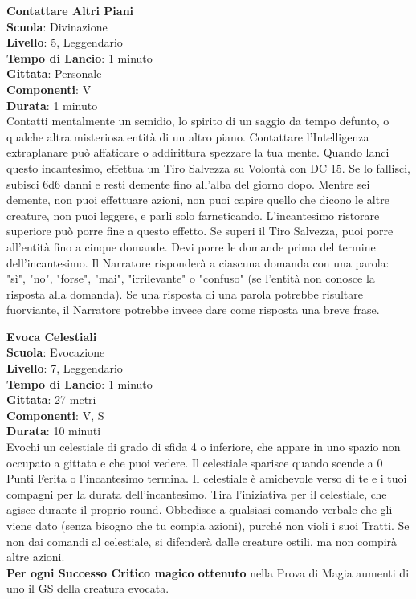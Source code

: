 \begin{multicols}{2}
\medskip\textbf{Contattare Altri Piani}\\
\textbf{Scuola}: Divinazione\\
\textbf{Livello}: 5, Leggendario\\
\textbf{Tempo di Lancio}: 1 minuto\\
\textbf{Gittata}: Personale\\
\textbf{Componenti}: V\\
\textbf{Durata}: 1 minuto\\
Contatti mentalmente un semidio, lo spirito di un saggio da tempo defunto, o qualche altra misteriosa entità di un altro piano. Contattare l'Intelligenza extraplanare può affaticare o addirittura spezzare la tua mente. Quando lanci questo incantesimo, effettua un Tiro Salvezza su Volontà con DC 15. Se lo fallisci, subisci 6d6 danni e resti demente fino all'alba del giorno dopo. Mentre sei demente, non puoi effettuare azioni, non puoi capire quello che dicono le altre creature, non puoi leggere, e parli solo farneticando. L'incantesimo ristorare superiore può porre fine a questo effetto. Se superi il Tiro Salvezza, puoi porre all'entità fino a cinque domande. Devi porre le domande prima del termine dell'incantesimo. Il Narratore risponderà a ciascuna domanda con una parola: "sì", "no", "forse", "mai", "irrilevante" o "confuso" (se l'entità non conosce la risposta alla domanda). Se una risposta di una parola potrebbe risultare fuorviante, il Narratore potrebbe invece dare come risposta una breve frase.

\medskip\textbf{Evoca Celestiali}\\
\textbf{Scuola}: Evocazione\\
\textbf{Livello}: 7, Leggendario\\
\textbf{Tempo di Lancio}: 1 minuto\\
\textbf{Gittata}: 27 metri\\
\textbf{Componenti}: V, S\\
\textbf{Durata}: 10 minuti\\
Evochi un celestiale di grado di sfida 4 o inferiore, che appare in uno spazio non occupato a gittata e che puoi vedere. Il celestiale sparisce quando scende a 0 Punti Ferita o l'incantesimo termina. Il celestiale è amichevole verso di te e i tuoi compagni per la durata dell'incantesimo. Tira l'iniziativa per il celestiale, che agisce durante il proprio round. Obbedisce a qualsiasi comando verbale che gli viene dato (senza bisogno che tu compia azioni), purché non violi i suoi Tratti. Se non dai comandi al celestiale, si difenderà dalle creature ostili, ma non compirà altre azioni.\\
\textbf{Per ogni Successo Critico magico ottenuto} nella Prova di Magia aumenti di uno il GS della creatura evocata.


\end{multicols}
